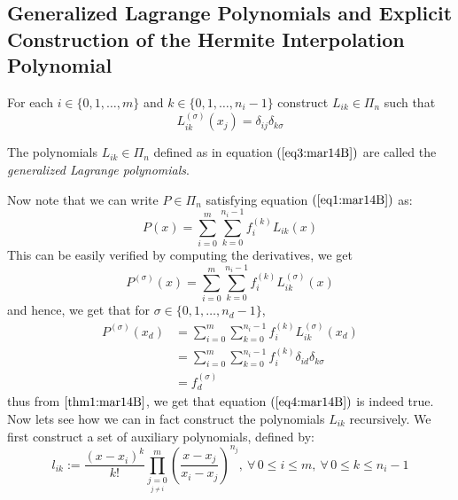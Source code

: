 \subsection{Generalized Lagrange Polynomials and Explicit Construction of the Hermite Interpolation Polynomial}

For each $i \in \{0,1,\dots,m\}$ and $k \in \{0,1,\dots,n_i-1\}$ construct $L_{ik} \in \Pi_n$ such that  
\begin{equation}\label{eq3:mar14B}
    L_{ik}^{(\sigma)}(x_j) = \delta_{ij} \delta_{k\sigma}
\end{equation}
\begin{defn}
    The polynomials $L_{ik} \in \Pi_n$ defined as in equation $(\ref{eq3:mar14B})$ are called the \textit{generalized Lagrange polynomials}.
\end{defn}
Now note that we can write $P \in \Pi_n$ satisfying equation $(\ref{eq1:mar14B})$ as:
\begin{equation}\label{eq4:mar14B}
    P(x) = \sum_{i=0}^m \sum_{k=0}^{n_i-1} f_i^{(k)} L_{ik}(x)
\end{equation}
This can be easily verified by computing the derivatives, we get 
\[
    P^{(\sigma)}(x) = \sum_{i=0}^m \sum_{k=0}^{n_i-1} f_i^{(k)}L^{(\sigma)}_{ik}(x)  
\]
and hence, we get that for $\sigma \in \{0,1,\dots, n_d-1\}$,
\begin{align*}
    P^{(\sigma)}(x_d) &= \sum_{i=0}^m \sum_{k=0}^{n_i-1} f_i^{(k)}L^{(\sigma)}_{ik}(x_d) \\ &= \sum_{i=0}^m \sum_{k=0}^{n_i-1} f_i^{(k)} \delta_{id}\delta_{k\sigma} \\ 
    &= f_d^{(\sigma)}  
\end{align*}
thus from  $\ref{thm1:mar14B}$, we get that equation $(\ref{eq4:mar14B})$ is indeed true. Now lets see how we can in fact construct the polynomials $L_{ik}$ recursively. We first construct a set of auxiliary polynomials, defined by:
\begin{equation}\label{eq5:mar14B}
    l_{ik} := \frac{(x-x_i)^k}{k!} \prod_{\underset{j \neq i}{j = 0}}^m \left(\frac{x-x_j}{x_i - x_j}\right)^{n_j}, \ \forall \, 0 \leq i \leq m, \ \forall \, 0 \leq k \leq n_i-1 
\end{equation}

